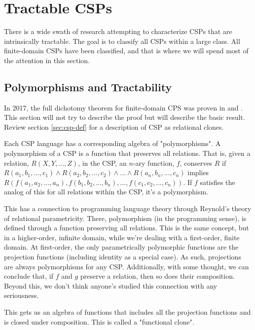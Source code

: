 \section{Tractable CSPs}\label{sec:tractable-csps}

There is a wide swath of research attempting to characterize CSPs that are intrinsically tractable. The goal is to classify all CSPs within a large class. All finite-domain CSPs have been classified, and that is where we will spend most of the attention in this section.

\subsection{Polymorphisms and Tractability}\label{sec:polymorphisms}

In 2017, the full dichotomy theorem for finite-domain CPS was proven in \citep{bulatov2017dichotomy} and \citep{zhuk2020proof}. This section will not try to describe the proof but will describe the basic result. Review section \ref{sec:csp-def} for a description of CSP as relational clones.

Each CSP language has a corresponding algebra of "polymorphisms". A polymorphism of a CSP is a function that preserves all relations. That is, given a relation, $R(X, Y, ..., Z)$, in the CSP, an $n$-ary function, $f$, conserves $R$ if $R(a_1, b_1, ..., c_1) \wedge R(a_2, b_2, ..., c_2) \wedge ... \wedge R(a_n, b_n, ..., c_n)$ implies $R(f(a_1, a_2, ..., a_n), f(b_1, b_2, ..., b_n), ..., f(c_1, c_2, ..., c_n))$. If $f$ satisfies the analog of this for all relations within the CSP, it’s a polymorphism.

\begin{remark}
This has a connection to programming language theory through Reynold’s theory of relational parametricity. There, polymorphism (in the programming sense), is defined through a function preserving all relations. This is the same concept, but in a higher-order, infinite domain, while we’re dealing with a first-order, finite domain. At first-order, the only parametrically polymorphic functions are the projection functions (including identity as a special case). As such, projections are always polymorphisms for any CSP. Additionally, with some thought, we can conclude that, if $f$ and $g$ preserve a relation, then so does their composition. Beyond this, we don’t think anyone’s studied this connection with any seriousness.
\end{remark}

This gets us an algebra of functions that includes all the projection functions and is closed under composition. This is called a "functional clone".

